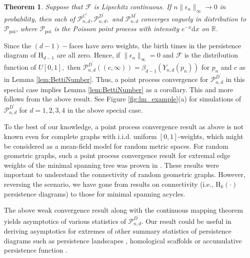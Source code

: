 \documentclass[12pt]{amsart}
\newcommand{\PoiP}{\mathscr{P}_{\text{poi}}}
\newcommand{\PoiFt}{\mathscr{P}_{n, d}^{C^\prime}}
\newcommand{\PoiMt}{\mathscr{P}_{n, d}^{M^\prime}}
\newcommand{\PoiDt}{\mathscr{P}_{n, d}^{D^\prime}}
\newcommand{\gt}[1]{\textcolor{blue}{#1}}
\renewcommand{\gt}[1]{#1}
\newtheorem{theorem}{Theorem}[section]
\numberwithin{equation}{section}
\numberwithin{theorem}{section}
\newcommand{\Hg}{\mathrm{H}}
\newcommand{\md}{\mathrm{d}}
\newcommand{\1}{\mathbf{1}}
\def\sF{\mathscr{F}}
\def\bR{\mathbb{R}}
\begin{document}
\begin{theorem}
\label{thm:perturbed_process_convergence}
Suppose that $\sF$ is \gt{Lipschitz continuous}. If $n \|\epsilon_n\|_{\infty} \to 0$ in probability, then each of $\PoiFt, \PoiDt,$ and $\PoiMt$ converges vaguely in distribution to $\PoiP$, where $\PoiP$  is the Poisson point process with intensity $e^{-x}\md x$ on $\bR$.
\end{theorem}
%
Since the $(d - 1)-$faces have zero weights, the birth times in the persistence diagram of $\Hg_{d - 1}$ are all zero. Hence, if $\|\epsilon_n\|_{\infty} = 0$ and $\sF$ is the distribution function of $U[0, 1],$ then $\PoiDt((c,\infty)) = \beta_{d-1}(Y_{n,d}(p_n))$ for $p_n$ and $c$ as in Lemma \ref{lem:BettiNumber}. Thus, a point process convergence for $\PoiDt$ in this special case implies Lemma \ref{lem:BettiNumber} as a corollary. This and more follows from the above result. See Figure \ref{fig:lm_example}(a) for simulations of $\PoiDt$ for $d = 1,2,3,4$ in the above special case.

To the best of our knowledge, a point process convergence result as above is not known even for complete graphs with i.i.d. uniform $[0,1]$-weights, which might be considered as a mean-field model for random metric spaces. For random geometric graphs, such a point process convergence result for extremal edge weights of the minimal spanning tree was proven in \cite{Penrose97,Hsing05}. These results were important to understand the connectivity of random geometric graphs. However, reversing the scenario, we have gone from results on connectivity (i.e., $\Hg_k(\cdot)$ persistence diagrams) to those for minimal spanning acycles.

The above weak convergence result along with the continuous mapping theorem yields asymptotics of various statistics of $\PoiDt$.  Our result could be useful in deriving asymptotics for extremes of other summary statistics of persistence diagrams such as persistence landscapes \cite{Bubenik15}, homological scaffolds \cite{Petri14} or accumulative persistence function \cite{accumulative2016}.
\end{document}
